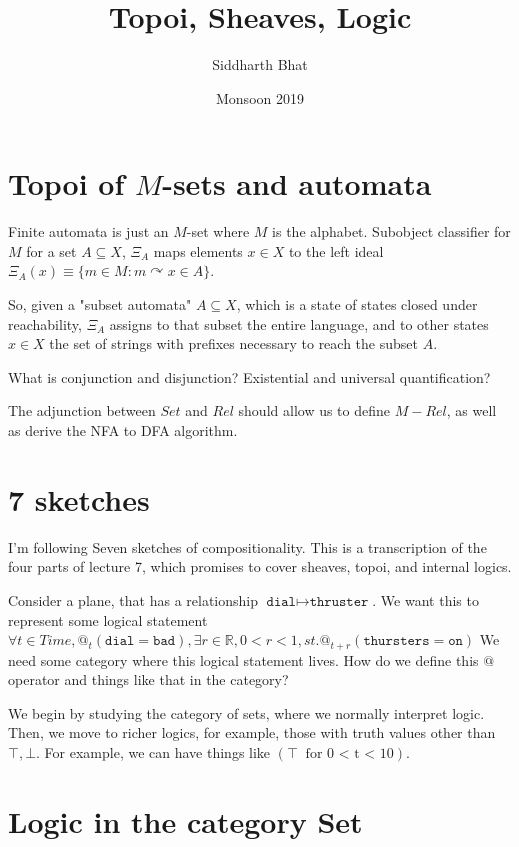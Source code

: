 \documentclass[11pt]{book}
\title{Topoi, Sheaves, Logic}
\author{Siddharth Bhat}
\date{Monsoon 2019}
\newcommand{\R}{\ensuremath{\mathbb R}}
\begin{document}
\maketitle
\tableofcontents

\chapter{Topoi of $M$-sets and automata}

Finite automata is just an $M$-set where $M$ is the alphabet.
Subobject classifier for $M$ for a set $A \subseteq X$, $\Xi_A$
maps elements $ x \in X$ 
to the left ideal $\Xi_A(x) \equiv \{ m \in M : m \curvearrowright x \in A \}$.

So, given a "subset automata" $A \subseteq X$, which is a state of states closed under
reachability, $\Xi_A$ assigns to that subset the entire language, and to
other states $x \in X$ the set of strings with prefixes necessary to reach the subset $A$.

What is conjunction and disjunction? Existential and universal quantification?

The adjunction between $Set$ and $Rel$ should allow us to define $M-Rel$, as
well as derive the NFA to DFA algorithm.

\chapter{7 sketches}
I'm following Seven sketches of compositionality. This is a transcription
of the four parts of lecture 7, which promises to cover sheaves, topoi, and
internal logics.

Consider a plane, that has a relationship $\texttt{dial} \mapsto \texttt{thruster}$.
We want this to represent some logical statement 
$\forall t \in Time, @_t (\texttt{dial} = \texttt{bad}), \exists r \in \R, 0 < r < 1, st. @_{t + r} (\texttt{thursters} = \texttt{on})$
We need some category where this logical statement lives. How do we define this
$@$ operator and things like that in the category?

We begin by studying the category of sets, where we normally interpret logic.
Then, we move to richer logics, for example, those with truth values other than
$\top, \bot$. For example, we can have things like $(\top~\text{ for 0 < t < 10})$.

\chapter{Logic in the category Set}
\end{document}
